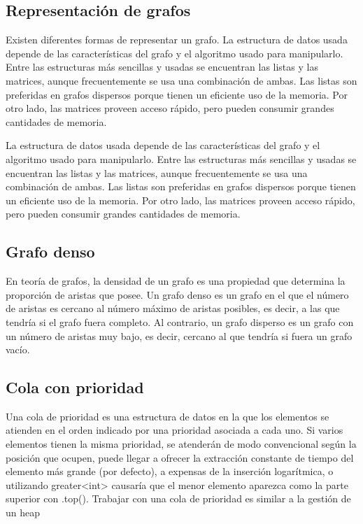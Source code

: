 \subsection{Representación de grafos}
Existen diferentes formas de representar un grafo. La estructura de datos usada depende de las características del grafo y el algoritmo usado para manipularlo. Entre las estructuras más sencillas y usadas se encuentran las listas y las matrices, aunque frecuentemente se usa una combinación de ambas. Las listas son preferidas en grafos dispersos porque tienen un eficiente uso de la memoria. Por otro lado, las matrices proveen acceso rápido, pero pueden consumir grandes cantidades de memoria.

La estructura de datos usada depende de las características del grafo y el algoritmo usado para manipularlo. Entre las estructuras más sencillas y usadas se encuentran las listas y las matrices, aunque frecuentemente se usa una combinación de ambas. Las listas son preferidas en grafos dispersos porque tienen un eficiente uso de la memoria. Por otro lado, las matrices proveen acceso rápido, pero pueden consumir grandes cantidades de memoria.

\subsection{Grafo denso}
En teoría de grafos, la densidad de un grafo es una propiedad que determina la proporción de aristas que posee. Un grafo denso es un grafo en el que el número de aristas es cercano al número máximo de aristas posibles, es decir, a las que tendría si el grafo fuera completo. Al contrario, un grafo disperso es un grafo con un número de aristas muy bajo, es decir, cercano al que tendría si fuera un grafo vacío. 


\subsection{Cola con prioridad}
Una cola de prioridad es una estructura de datos en la que los elementos se atienden en el orden
indicado por una prioridad asociada a cada uno. Si varios elementos tienen la misma prioridad, se
atenderán de modo convencional según la posición que ocupen, puede llegar a ofrecer la extracción
constante de tiempo del elemento más grande (por defecto), a expensas de la inserción logarítmica, o
utilizando greater<int> causaría que el menor elemento aparezca como la parte superior con .top().
Trabajar con una cola de prioridad es similar a la gestión de un heap

